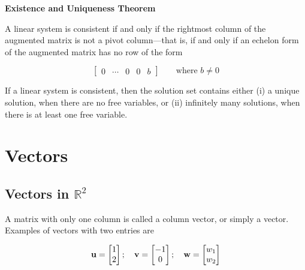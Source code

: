 \documentclass[
  letterpaper,
  DIV=11,
  numbers=noendperiod]{scrreprt}
\begin{document}
\begin{tcolorbox}[enhanced jigsaw, leftrule=.75mm, opacityback=0, title=\textcolor{quarto-callout-note-color}{\faInfo}\hspace{0.5em}{Theorem 2}, coltitle=black, breakable, colbacktitle=quarto-callout-note-color!10!white, colframe=quarto-callout-note-color-frame, toprule=.15mm, bottomtitle=1mm, arc=.35mm, toptitle=1mm, opacitybacktitle=0.6, bottomrule=.15mm, rightrule=.15mm, titlerule=0mm, colback=white, left=2mm]

\textbf{Existence and Uniqueness Theorem}

A linear system is consistent if and only if the rightmost column of the
augmented matrix is not a pivot column---that is, if and only if an
echelon form of the augmented matrix has no row of the form

\[
\left[\begin{array}{cccc|c}
0 & \cdots & 0 & 0 & b
\end{array}\right]
\;\;\;\;\;\;\;\text{where } b \neq 0
\]

If a linear system is consistent, then the solution set contains either
(i) a unique solution, when there are no free variables, or (ii)
infinitely many solutions, when there is at least one free variable.

\end{tcolorbox}


\hypertarget{vectors}{%
\chapter{Vectors}\label{vectors}}

\hypertarget{vectors-in-mathbbr2}{%
\section*{\texorpdfstring{Vectors in
\(\mathbb{R}^2\)}{Vectors in \textbackslash mathbb\{R\}\^{}2}}\label{vectors-in-mathbbr2}}


A matrix with only one column is called a column vector, or simply a
vector. Examples of vectors with two entries are

\[
\bf{u} = 
\begin{bmatrix}
1 \\
2
\end{bmatrix}
;
\quad
\bf{v} = 
\begin{bmatrix}
-1 \\
0
\end{bmatrix}
;
\quad
\bf{w} = 
\begin{bmatrix}
w_1 \\
w_2
\end{bmatrix}
\]
\end{document}
